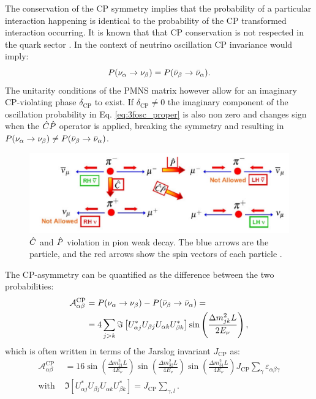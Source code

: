 The conservation of the CP symmetry implies that the probability of a particular interaction happening is identical to the probability of the CP transformed interaction occurring. It is known that that CP conservation is not respected in the quark sector \cite{Bona:2024bue}. In the context of neutrino oscillation CP invariance would imply:
\begin{equation}
    P(\nu_\alpha \rightarrow \nu_\beta) = P(\Bar{\nu}_\beta \rightarrow \Bar{\nu}_\alpha) .
\end{equation}
The unitarity conditions of the PMNS matrix however allow for an imaginary CP-violating phase $\delta_\text{CP}$ to exist. If $\delta_\text{CP}\neq 0$ the imaginary component of the oscillation probability in Eq. \ref{eq:3fosc_proper} is also non zero and changes sign when the $\Hat{C}\Hat{P}$ operator is applied, breaking the symmetry and resulting in $    P(\nu_\alpha \rightarrow \nu_\beta) \neq P(\Bar{\nu}_\beta \rightarrow \Bar{\nu}_\alpha)$.
\begin{figure}
    \centering
    \includegraphics[width=0.9\linewidth]{figures//ch2-Theory/piondecay.png}
    \caption[$\Hat{C}$ and $\Hat{P}$ violation in pion weak decay]{$\Hat{C}$ and $\Hat{P}$ violation in pion weak decay. The blue arrows are the particle, and the red arrows show the spin vectors of each particle \cite{Boyde2005}.}
    \label{fig:piondecay}
\end{figure}
The CP-asymmetry can be quantified as the difference between the two probabilities:
\begin{equation}
\begin{aligned}
    \mathcal{A}^\text{CP}_{\alpha\beta} &= P(\nu_\alpha \rightarrow \nu_\beta)-P(\Bar{\nu}_\beta \rightarrow \Bar{\nu}_\alpha) = \\
    &=4 \sum_{j>k}\Im\left[U_{\alpha j}^*U_{\beta j}U_{\alpha k}U_{\beta k}^*\right]\sin\left(\frac{\Delta m^2_{jk}L}{2E_\nu}\right) ,
\end{aligned}
\end{equation}
which is often written in terms of the Jarslog invariant $J_\text{CP}$ as:
\begin{equation}
    \begin{aligned}
    \mathcal{A}^\text{CP}_{\alpha\beta}&=16\sin\left(\frac{\Delta m^2_{21}L}{4E_\nu}\right) \sin\left(\frac{\Delta m^2_{32}L}{4E_\nu}\right) \sin\left(\frac{\Delta m^2_{31}L}{4E_\nu}\right) J_\text{CP} \sum_{\gamma}\varepsilon_{\alpha\beta\gamma}\\
    \text{with } & \Im\left[U^*_{\alpha j}U_{\beta j}U_{\alpha k}U^*_{\beta k}\right] = J_{\text{CP}} \sum_{\gamma,l} . %
    \end{aligned}
\end{equation}

